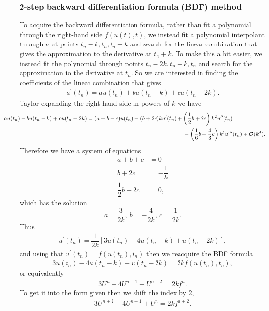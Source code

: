 \documentclass[12pt]{article}
\newcommand{\bO}{\mathcal{O}}
\begin{document}
\subsubsection*{2-step backward differentiation formula (BDF) method}
To acquire the backward differentiation formula, rather than fit a polynomial through the right-hand side $f(u(t),t)$, we instead fit a polynomial interpolant through $u$ at points $t_{n}-k, t_{n}, t_{n}+k$ and search for the linear combination that gives the approximation to the derivative at $t_{n}+k$. To make this a bit easier, we instead fit the polynomial through points $t_{n}-2k, t_{n}-k, t_{n}$ and search for the approximation to the derivative at $t_{n}$. So we are interested in finding the coefficients of the linear combination that gives 
\begin{align}
	u^{\prime}(t_{n}) = au(t_{n}) + bu(t_{n}-k) +cu(t_{n}-2k).
\end{align}
Taylor expanding the right hand side in powers of $k$ we have
\begin{align}
	\hspace{-1cm}au(t_{n}) + bu(t_{n}-k) +cu(t_{n}-2k) &= (a+b+c)u(t_{n})-(b+2c)ku^{\prime}(t_{n})
	+\left(\frac{1}{2}b+2c\right)k^2 u^{\prime\prime}(t_{n})\nonumber\\
	&\hspace{6cm}-\left(\frac{1}{6}b+\frac{4}{3}c\right)k^3 u^{\prime\prime\prime}(t_{n}) + \bO(k^{4}).
\end{align}
Therefore we have a system of equations
\begin{subequations}
	\begin{align}
		a+b+c &= 0\\
		b+2c &= -\dfrac{1}{k}\\
		\dfrac{1}{2}b+2c &= 0,
	\end{align}
\end{subequations}
which has the solution $$a = \dfrac{3}{2k},\ b = -\dfrac{4}{2k},\ c=\dfrac{1}{2k}. $$
Thus
\begin{align}
	u^{\prime}(t_{n}) = \dfrac{1}{2k}\left[3u(t_{n}) - 4u(t_{n}-k) +u(t_{n}-2k)\right],
\end{align}
and using that $u^{\prime}(t_{n}) = f(u(t_{n}),t_{n})$ then we reacquire the BDF formula
\begin{align}
	3u(t_{n}) - 4u(t_{n}-k) +u(t_{n}-2k) = 2kf(u(t_{n}),t_{n}),
\end{align}
or equivalently
\begin{align}
	3U^{n} - 4U^{n-1} + U^{n-2} = 2kf^{n}.
\end{align}
To get it into the form given then we shift the index by 2, 
\begin{align}
	3U^{n+2} - 4U^{n+1} + U^{n} = 2kf^{n+2}.
\end{align}
\end{document}
